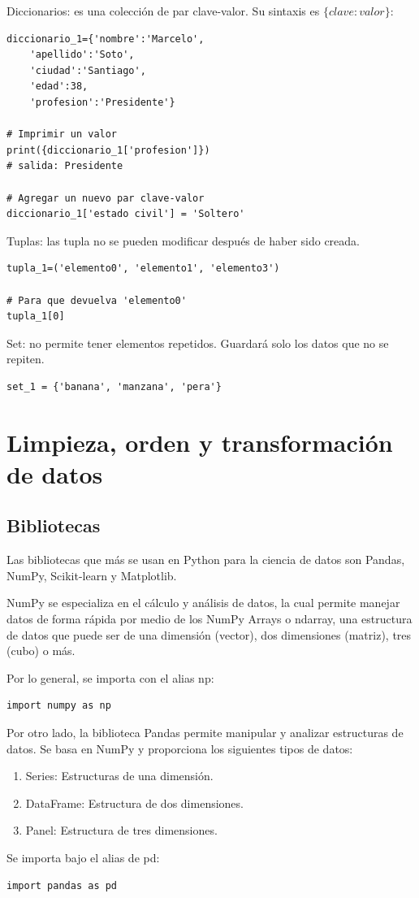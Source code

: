 \documentclass[a4paper, 12pt]{book}
\begin{document}
Diccionarios: es una colección de par clave-valor. Su sintaxis es $\{clave: valor\}$:
\begin{verbatim}
diccionario_1={'nombre':'Marcelo',
	'apellido':'Soto',
	'ciudad':'Santiago',
	'edad':38,
	'profesion':'Presidente'}

# Imprimir un valor
print({diccionario_1['profesion']})
# salida: Presidente
	
# Agregar un nuevo par clave-valor
diccionario_1['estado civil'] = 'Soltero'
\end{verbatim}

Tuplas: las tupla no se pueden modificar después de haber sido creada.
\begin{verbatim}
tupla_1=('elemento0', 'elemento1', 'elemento3')
	
# Para que devuelva 'elemento0'
tupla_1[0]
\end{verbatim}

Set: no permite tener elementos repetidos. Guardará solo los datos que no se repiten.
\begin{verbatim}
set_1 = {'banana', 'manzana', 'pera'}
\end{verbatim}

\section{Limpieza, orden y transformación de datos}

\subsection{Bibliotecas}
Las bibliotecas que más se usan en Python para la ciencia de datos son Pandas, NumPy, Scikit-learn y Matplotlib.

NumPy se especializa en el cálculo y análisis de datos, la cual permite manejar datos de forma rápida por medio de los NumPy Arrays o ndarray, una estructura de datos que puede ser de una dimensión (vector), dos dimensiones (matriz), tres (cubo) o más.

Por lo general, se importa con el alias np:
\begin{verbatim}
import numpy as np
\end{verbatim}
Por otro lado, la biblioteca Pandas permite manipular y analizar estructuras de datos. Se basa en NumPy y proporciona los siguientes tipos de datos:
\begin{enumerate}
	\item Series: Estructuras de una dimensión.
	\item DataFrame: Estructura de dos dimensiones.
	\item Panel: Estructura de tres dimensiones.
\end{enumerate}
Se importa bajo el alias de pd:
\begin{verbatim}
import pandas as pd
\end{verbatim}
\end{document}

